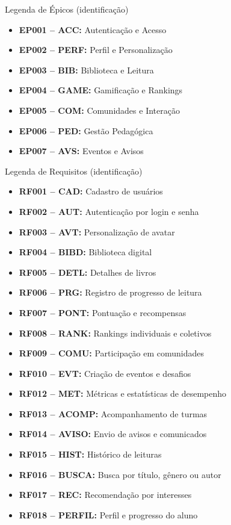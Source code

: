 \documentclass[aspectratio=169]{beamer}
\begin{document}
\begin{frame}{Legenda de Épicos (identificação)}
\small
\begin{itemize}
    \item \textbf{EP001 -- ACC:} Autenticação e Acesso
    \item \textbf{EP002 -- PERF:} Perfil e Personalização
    \item \textbf{EP003 -- BIB:} Biblioteca e Leitura
    \item \textbf{EP004 -- GAME:} Gamificação e Rankings
    \item \textbf{EP005 -- COM:} Comunidades e Interação
    \item \textbf{EP006 -- PED:} Gestão Pedagógica
    \item \textbf{EP007 -- AVS:} Eventos e Avisos
\end{itemize}
\end{frame}

\begin{frame}{Legenda de Requisitos (identificação)}
\scriptsize
\begin{itemize}
    \item \textbf{RF001 -- CAD:} Cadastro de usuários
    \item \textbf{RF002 -- AUT:} Autenticação por login e senha
    \item \textbf{RF003 -- AVT:} Personalização de avatar
    \item \textbf{RF004 -- BIBD:} Biblioteca digital
    \item \textbf{RF005 -- DETL:} Detalhes de livros
    \item \textbf{RF006 -- PRG:} Registro de progresso de leitura
    \item \textbf{RF007 -- PONT:} Pontuação e recompensas
    \item \textbf{RF008 -- RANK:} Rankings individuais e coletivos
    \item \textbf{RF009 -- COMU:} Participação em comunidades
    \item \textbf{RF010 -- EVT:} Criação de eventos e desafios
    \item \textbf{RF012 -- MET:} Métricas e estatísticas de desempenho
    \item \textbf{RF013 -- ACOMP:} Acompanhamento de turmas
    \item \textbf{RF014 -- AVISO:} Envio de avisos e comunicados
    \item \textbf{RF015 -- HIST:} Histórico de leituras
    \item \textbf{RF016 -- BUSCA:} Busca por título, gênero ou autor
    \item \textbf{RF017 -- REC:} Recomendação por interesses
    \item \textbf{RF018 -- PERFIL:} Perfil e progresso do aluno
\end{itemize}
\end{frame}
\end{document}
